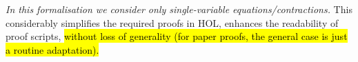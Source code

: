 
\emph{In this
formalisation we consider only single-variable equations/contractions.}
This considerably
 simplifies the required proofs in HOL, enhances the readability of
 proof scripts, \hl{without loss of generality (for paper proofs, the
 general case is just a routine
 adaptation).}




